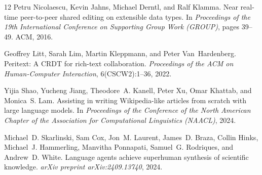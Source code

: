 \documentclass[11pt,a4paper]{article}
\begin{document}
\begin{thebibliography}{12}
Petru Nicolaescu, Kevin Jahns, Michael Derntl, and Ralf Klamma.
\newblock Near real-time peer-to-peer shared editing on extensible data types.
\newblock In \emph{Proceedings of the 19th International Conference on Supporting Group Work (GROUP)}, pages 39--49. ACM, 2016.

Geoffrey Litt, Sarah Lim, Martin Kleppmann, and Peter Van~Hardenberg.
\newblock Peritext: A CRDT for rich-text collaboration.
\newblock \emph{Proceedings of the ACM on Human-Computer Interaction}, 6(CSCW2):1--36, 2022.

Yijia Shao, Yucheng Jiang, Theodore~A. Kanell, Peter Xu, Omar Khattab, and Monica~S. Lam.
\newblock Assisting in writing Wikipedia-like articles from scratch with large language models.
\newblock In \emph{Proceedings of the Conference of the North American Chapter of the Association for Computational Linguistics (NAACL)}, 2024.

Michael~D. Skarlinski, Sam Cox, Jon~M. Laurent, James~D. Braza, Collin Hinks, Michael~J. Hammerling, Manvitha Ponnapati, Samuel~G. Rodriques, and Andrew~D. White.
\newblock Language agents achieve superhuman synthesis of scientific knowledge.
\newblock \emph{arXiv preprint arXiv:2409.13740}, 2024.

\end{thebibliography}
\end{document}
